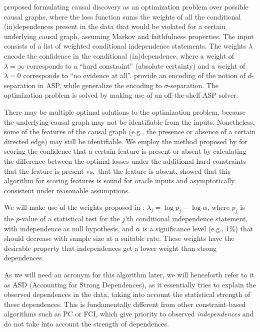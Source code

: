 \documentclass[twoside,11pt]{article}
\begin{document}
\citet{HEJ2014} proposed formulating causal discovery as an optimization problem over possible causal graphs, where
the loss function sums the weights of all the conditional (in)dependences present in the data that would
be violated for a certain underlying causal graph, assuming Markov and faithfulness properties.
The input consists of a list of weighted conditional independence statements. The weights $\lambda$ encode the
confidence in the conditional (in)dependence, where a weight of $\lambda=\infty$ corresponds to a ``hard
constraint'' (absolute certainty) and a weight of $\lambda=0$ corresponds to ``no evidence at all''.
\citet{HEJ2014} provide an encoding of the notion of $d$-separation in ASP, while \citet{ForreMooij_UAI_18}
generalize the encoding to $\sigma$-separation.
The optimization problem is solved by making use of an off-the-shelf ASP solver.

There may be multiple optimal solutions to the optimization problem, because the underlying causal graph may not be identifiable from the inputs. 
Nonetheless, some of the features of the causal graph (e.g., the presence or absence of a certain directed edge) may still be identifiable.
We employ the method proposed by \citet{MagliacaneClaassenMooij_NIPS_16} for scoring the confidence that a certain feature is present or absent by calculating the difference between the optimal losses under the additional hard constraints that the feature is present vs.\ that the feature is absent.
\citet{MagliacaneClaassenMooij_NIPS_16} showed that this algorithm for scoring features is sound for oracle inputs and asymptotically consistent under reasonable assumptions.

We will make use of the weights proposed in \citet{MagliacaneClaassenMooij_NIPS_16}:
$\lambda_j = \log p_j - \log \alpha$, where $p_j$ is the $p$-value of a statistical test for the
$j$'th conditional independence statement, with independence as null hypothesis, 
and $\alpha$ is a significance level (e.g., 1\%) that should decrease with sample size at a suitable rate.
These weights have the desirable property that independences get a lower weight
than strong dependences.

As we will need an acronym for this algorithm later, we will henceforth refer to it as ASD (Accounting for Strong Dependences),
as it essentially tries to explain the observed dependences in the data, taking into account the statistical strength of these dependences.
This is fundamentally different from other constraint-based algorithms such as PC or FCI, which give priority to
observed \emph{independences} and do not take into account the strength of dependences.
\end{document}

